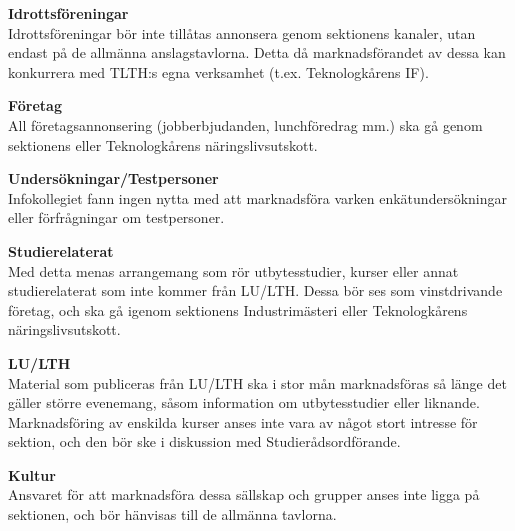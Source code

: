 \documentclass{dsekprotokoll}
\begin{document}
\textbf{Idrottsföreningar}\\
Idrottsföreningar bör inte tillåtas annonsera genom sektionens kanaler, utan endast på
de allmänna anslagstavlorna. Detta då marknadsförandet av dessa kan konkurrera med
TLTH:s egna verksamhet (t.ex. Teknologkårens IF).

\textbf{Företag}\\
All företagsannonsering (jobberbjudanden, lunchföredrag mm.) ska gå genom sektionens
eller Teknologkårens näringslivsutskott.

\textbf{Undersökningar/Testpersoner}\\
Infokollegiet fann ingen nytta med att marknadsföra varken enkätundersökningar eller
förfrågningar om testpersoner.

\textbf{Studierelaterat}\\
Med detta menas arrangemang som rör utbytesstudier, kurser eller annat studierelaterat
som inte kommer från LU/LTH. Dessa bör ses som vinstdrivande företag, och ska gå
igenom sektionens Industrimästeri eller Teknologkårens näringslivsutskott.

\textbf{LU/LTH}\\
Material som publiceras från LU/LTH ska i stor mån marknadsföras så länge det gäller
större evenemang, såsom information om utbytesstudier eller liknande. Marknadsföring
av enskilda kurser anses inte vara av något stort intresse för sektion, och den bör ske i
diskussion med Studierådsordförande.

\textbf{Kultur}\\
Ansvaret för att marknadsföra dessa sällskap och grupper anses inte ligga på sektionen,
och bör hänvisas till de allmänna tavlorna.
\end{document}
